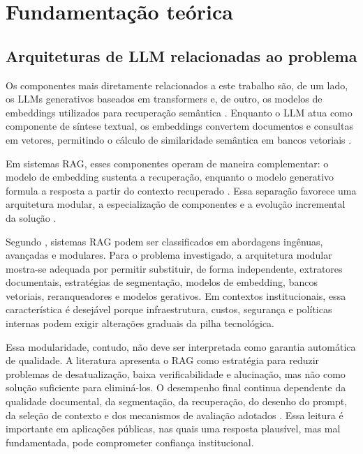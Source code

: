 \section{Fundamentação teórica}

\subsection{Arquiteturas de LLM relacionadas ao problema}

Os componentes mais diretamente relacionados a este trabalho são, de um lado, os LLMs generativos baseados em transformers \parencite{vaswani2017attention} e, de outro, os modelos de embeddings utilizados para recuperação semântica \parencite{nie2024textEmbeddingSurvey}. Enquanto o LLM atua como componente de síntese textual, os embeddings convertem documentos e consultas em vetores, permitindo o cálculo de similaridade semântica em bancos vetoriais \parencite{gao2023ragSurvey}.

Em sistemas RAG, esses componentes operam de maneira complementar: o modelo de embedding sustenta a recuperação, enquanto o modelo generativo formula a resposta a partir do contexto recuperado \parencite{lewisEtAl2020rag,gao2023ragSurvey}. Essa separação favorece uma arquitetura modular, a especialização de componentes e a evolução incremental da solução \parencite{gao2024modularRag}.

Segundo \textcite{gao2023ragSurvey}, sistemas RAG podem ser classificados em abordagens ingênuas, avançadas e modulares. Para o problema investigado, a arquitetura modular mostra-se adequada por permitir substituir, de forma independente, extratores documentais, estratégias de segmentação, modelos de embedding, bancos vetoriais, reranqueadores e modelos gerativos. Em contextos institucionais, essa característica é desejável porque infraestrutura, custos, segurança e políticas internas podem exigir alterações graduais da pilha tecnológica.

Essa modularidade, contudo, não deve ser interpretada como garantia automática de qualidade. A literatura apresenta o RAG como estratégia para reduzir problemas de desatualização, baixa verificabilidade e alucinação, mas não como solução suficiente para eliminá-los. O desempenho final continua dependente da qualidade documental, da segmentação, da recuperação, do desenho do prompt, da seleção de contexto e dos mecanismos de avaliação adotados \parencite{gao2023ragSurvey,gupta2024comprehensiveRag,saadFalconEtAl2024ares}. Essa leitura é importante em aplicações públicas, nas quais uma resposta plausível, mas mal fundamentada, pode comprometer confiança institucional.

